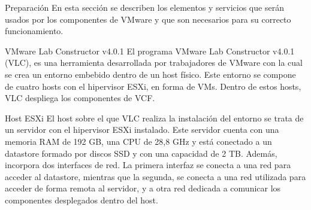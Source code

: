 \begin{subsection}{Preparación}
  En esta sección se describen los elementos y servicios que serán usados por los componentes de VMware y que son necesarios para su correcto funcionamiento.

  \begin{subsubsection}{VMware Lab Constructor v4.0.1}
    El programa VMware Lab Constructor v4.0.1 (VLC), es una herramienta desarrollada por trabajadores de VMware con la cual se crea un entorno embebido dentro de un host físico. Este entorno se compone de cuatro hosts con el hipervisor ESXi, en forma de VMs. Dentro de estos hosts, VLC despliega los componentes de VCF.

  \end{subsubsection}

  \begin{subsubsection}{Host ESXi}  
    El host sobre el que VLC realiza la instalación del entorno se trata de un servidor con el hipervisor ESXi instalado. Este servidor cuenta con una memoria RAM de 192 GB, una CPU de 28,8 GHz y está conectado a un datastore formado por discos SSD y con una capacidad de 2 TB. Además, incorpora dos interfaces de red. La primera interfaz se conecta a una red para acceder al datastore, mientras que la segunda, se conecta a una red utilizada para acceder de forma remota al servidor, y a otra red dedicada a comunicar los componentes desplegados dentro del host.

  \end{subsubsection}


\end{subsection}
